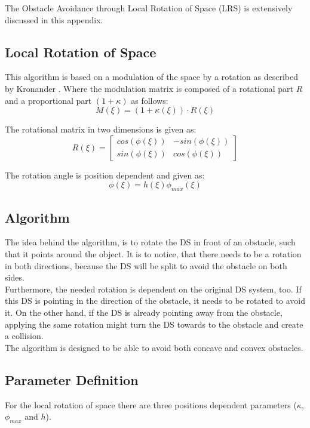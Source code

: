 \appendix
The Obstacle Avoidance through Local Rotation of Space (LRS) is extensively discussed in this appendix.

\subsection{Local Rotation of Space}
This algorithm is based on a modulation of the space by a rotation as described by Kronander \cite{kronander2015incremental}. Where the modulation matrix is composed of a rotational part $R$ and a proportional part $(1+ \kappa)$ as follows:
\begin{equation}
M ( \xi ) = (1 + \kappa (\xi) ) \cdot R(\xi)
\end{equation}

The rotational matrix in two dimensions is given as:
\begin{equation}
R(\xi ) =
\begin{bmatrix}
cos(\phi (\xi)) & -sin(\phi (\xi)) \\
sin(\phi (\xi)) & cos(\phi (\xi))
\end{bmatrix}
\end{equation}

The rotation angle is position dependent and given as:
\begin{equation}
\phi (\xi) = h(\xi) \phi_{max}(\xi)
\end{equation}

\subsection{Algorithm}
The idea behind the algorithm, is to rotate the DS in front of an obstacle, such that it points around the object. It is to notice, that there needs to be a rotation in both directions, because the DS will be split to avoid the obstacle on both sides.\\
Furthermore, the needed rotation is dependent on the original DS system, too. If this DS is pointing in the direction of the obstacle, it needs to be rotated to avoid it. On the other hand, if the DS is already pointing away from the obstacle, applying the same rotation might turn the DS towards to the obstacle and create a collision. \\
The algorithm is designed to be able to avoid both concave and convex obstacles.

\subsection{Parameter Definition}
For the local rotation of space there are three positions dependent parameters ($\kappa$, $\phi_{max}$ and $h$).

